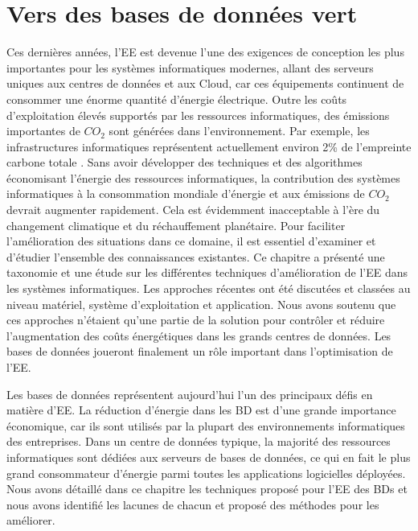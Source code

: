 \section{Vers des bases de données vert}
Ces dernières années, l'EE est devenue l'une des exigences de conception les plus importantes pour les systèmes informatiques modernes, allant des serveurs uniques aux centres de données et aux Cloud, car ces équipements continuent de consommer une énorme quantité d'énergie électrique. Outre les coûts d'exploitation élevés supportés par les ressources informatiques, des émissions importantes de $CO_2$ sont générées dans l'environnement. Par exemple, les infrastructures informatiques représentent actuellement environ 2\% de l'empreinte carbone totale \cite{Beloglazov11}. Sans avoir développer des techniques et des algorithmes économisant l'énergie des ressources informatiques, la contribution des systèmes informatiques à la consommation mondiale d'énergie et aux émissions de $CO_2$ devrait augmenter rapidement. Cela est évidemment inacceptable à l'ère du changement climatique et du réchauffement planétaire. Pour faciliter l'amélioration des situations dans ce domaine, il est essentiel d'examiner et d'étudier l'ensemble des connaissances existantes. Ce chapitre a présenté une taxonomie et une étude sur les différentes techniques d'amélioration de l'EE dans les systèmes informatiques. Les approches récentes ont été discutées et classées au niveau matériel, système d'exploitation et application. Nous avons soutenu que ces approches n'étaient qu'une partie de la solution pour contrôler et réduire l'augmentation des coûts énergétiques dans les grands centres de données. Les bases de données joueront finalement un rôle important dans l'optimisation de l'EE.

Les bases de données représentent aujourd'hui l'un des principaux défis en matière d'EE. La réduction d'énergie dans les BD est d'une grande importance économique, car ils sont utilisés par la plupart des environnements informatiques des entreprises. Dans un centre de données typique, la majorité des ressources informatiques sont dédiées aux serveurs de bases de données, ce qui en fait le plus grand consommateur d'énergie parmi toutes les applications logicielles déployées. Nous avons détaillé dans ce chapitre les techniques proposé pour l'EE des BDs et nous avons identifié les lacunes de chacun et proposé des méthodes pour les améliorer.

